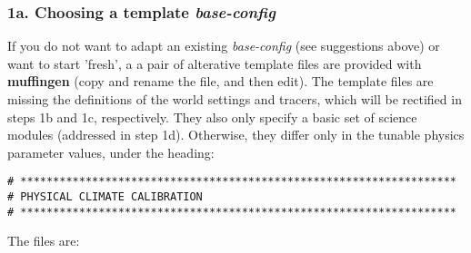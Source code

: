 \documentclass[11pt,fleqn]{book} %
\begin{document}
%
\subsubsection{1a. Choosing a template \textit{base-config}}

If you do not want to adapt an existing \textit{base-config} (see suggestions above) or want to start 'fresh', a a pair of alterative template files are provided with \textbf{muffingen} (copy and rename the file, and then edit). The template files are missing the definitions of the world settings and tracers, which will be rectified in steps 1b and 1c, respectively. They also only specify a basic set of science modules (addressed in step 1d). Otherwise, they differ only in the tunable physics parameter values, under the heading:

\footnotesize\vspace{-2pt}\begin{verbatim}
# *******************************************************************
# PHYSICAL CLIMATE CALIBRATION
# *******************************************************************
\end{verbatim}\vspace{-2pt}\normalsize
The files are:
\end{document}
